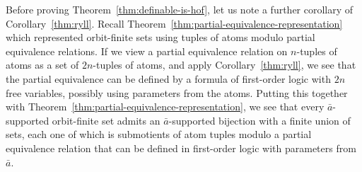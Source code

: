 Before proving Theorem~\ref{thm:definable-is-hof}, let us note a further corollary of Corollary~\ref{thm:ryll}.
Recall Theorem~\ref{thm:partial-equivalence-representation} which represented orbit-finite sets using tuples of atoms modulo partial equivalence relations. If we view a partial equivalence relation on $n$-tuples of atoms as a set of $2n$-tuples of atoms, and apply Corollary~\ref{thm:ryll}, we see that the partial equivalence can be defined by a formula of first-order logic with $2n$ free variables, possibly using parameters from the atoms. Putting this together with Theorem~\ref{thm:partial-equivalence-representation}, we see that every $\bar a$-supported orbit-finite set admits an $\bar a$-supported bijection with a finite union of sets, each one of which is submotients of atom tuples modulo a partial equivalence relation that can be defined in first-order logic with parameters from $\bar a$. 


